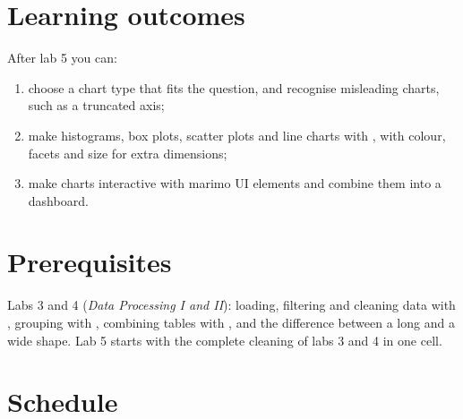 \documentclass[11pt,a4paper]{article}
\begin{document}



\section{Learning outcomes}

After lab 5 you can:

\begin{enumerate}[label=\textbf{LO\arabic*}, leftmargin=1.4cm]
  \item choose a chart type that fits the question, and recognise
        misleading charts, such as a truncated axis;
  \item make histograms, box plots, scatter plots and line charts with
        , with colour, facets and size for extra
        dimensions;
  \item make charts interactive with marimo UI elements and combine them
        into a dashboard.
\end{enumerate}

\section{Prerequisites}

Labs 3 and 4 (\emph{Data Processing I and II}): loading, filtering and
cleaning data with , grouping with , combining
tables with , and the difference between a long and a wide
shape. Lab 5 starts with the complete cleaning of labs 3 and 4 in one
cell.





\section{Schedule}


\end{document}
